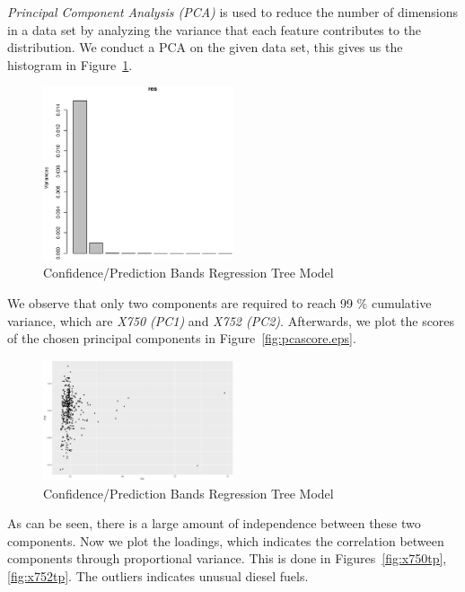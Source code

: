\documentclass[a4paper, twocolumn]{article}
\begin{document}
        \emph{Principal Component Analysis (PCA)} is used to reduce the number of dimensions in a data set by analyzing the variance that each feature contributes to the distribution. We conduct a PCA on the given data set, this gives us the histogram in Figure~\ref{fig:pcahist}.

        \begin{figure}[h!]
            \centering
            \caption{Confidence/Prediction Bands Regression Tree Model}
            \label{fig:pcahist}
            \includegraphics[width=0.5\textwidth]{share/A2_pcahist.eps}
        \end{figure}

        We observe that only two components are required to reach 99 \% cumulative variance, which are \emph{X750 (PC1)} and \emph{X752 (PC2)}. Afterwards, we plot the scores of the chosen principal components in Figure~\ref{fig:pcascore.eps}.

        \begin{figure}[h!]
            \centering
            \caption{Confidence/Prediction Bands Regression Tree Model}
            \label{fig:pcascore}
            \includegraphics[width=0.5\textwidth]{share/A2_pcascore.eps}
        \end{figure}

        As can be seen, there is a large amount of independence between these two components. Now we plot the loadings, which indicates the correlation between components through proportional variance. This is done in Figures~\ref{fig:x750tp}, \ref{fig:x752tp}. The outliers indicates unusual diesel fuels.
\end{document}
